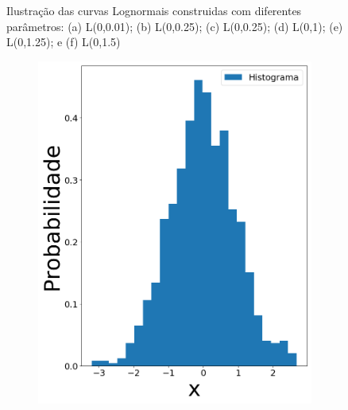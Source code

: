 \begin{figure}[H]
\begin{subfigure}[b]{0.3\textwidth}
		\caption{}
		\label{fig:sig150}
	\end{subfigure}
	
	\caption{Ilustração das curvas Lognormais construidas com diferentes parâmetros: (a) L(0,0.01); (b) L(0,0.25); (c) L(0,0.25); (d) L(0,1); (e) L(0,1.25); e (f) L(0,1.5)}
	\label{fig:Lognormal}
\end{figure}



\begin{figure}[H]
	\centering
	\begin{subfigure}[b]{0.27\textwidth}
		\centering 
		\includegraphics[width=\linewidth]{./figuras/datanormal_0}
		\caption{}
		\label{fig:randn}
	\end{subfigure}
	\hfill
	\begin{subfigure}[b]{0.27\textwidth}
		\centering 

\end{subfigure}
\end{figure}

